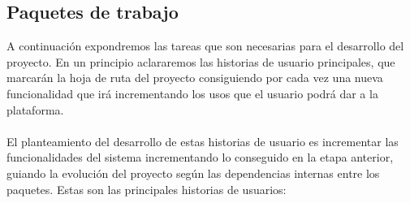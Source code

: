 \documentclass{article}
\begin{document}
       	\subsection{Paquetes de trabajo}
        A continuación expondremos las tareas que son necesarias para el desarrollo del proyecto. En un principio aclararemos las historias de usuario principales, que marcarán la hoja de ruta del proyecto consiguiendo por cada vez una nueva funcionalidad que irá incrementando los usos que el usuario podrá dar a la plataforma.
        
        \paragraph{}
        El planteamiento del desarrollo de estas historias de usuario es incrementar las funcionalidades del sistema incrementando lo conseguido en la etapa anterior, guiando la evolución del proyecto según las dependencias internas entre los paquetes. Estas son las principales historias de usuarios:
\end{document}

